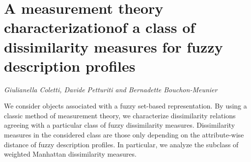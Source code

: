 \documentclass[../booklet.tex]{subfiles}
\begin{document}
\section[A measurement theory characterizationof a class of dissimilarity measures for fuzzy description profiles. {\it Giulianella Coletti, Davide Petturiti and Bernadette Bouchon-Meunier}]{A measurement theory characterizationof a class of dissimilarity measures for fuzzy description profiles}
  

\begin{center}
  {\it Giulianella Coletti, Davide Petturiti and Bernadette Bouchon-Meunier}
\end{center}

\vskip 0.8cm



We consider objects associated with a fuzzy set-based
representation. By using a classic method of measurement
theory, we characterize dissimilarity relations agreeing with a particular class of fuzzy dissimilarity
measures. Dissimilarity measures in the considered class are those only depending on the attribute-wise distance of fuzzy description profiles. In particular, we analyze the subclass of weighted Manhattan dissimilarity measures.

\end{document}
